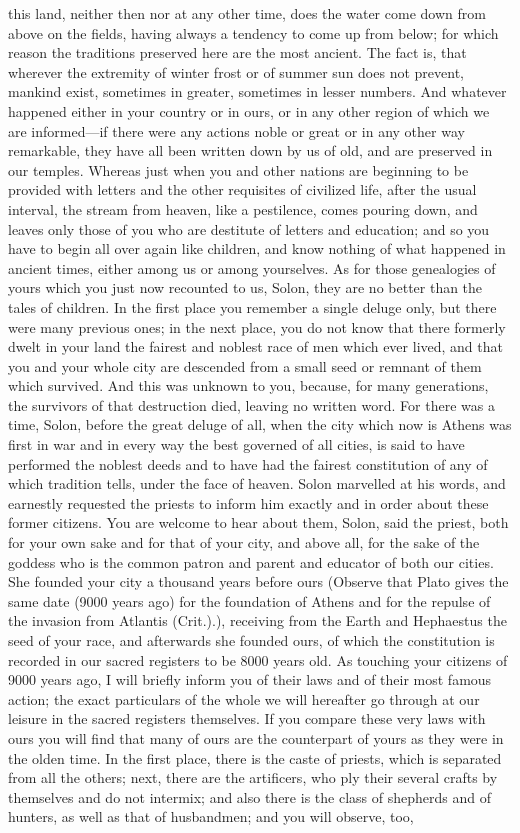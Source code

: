\documentclass[12pt]{article}
\begin{document}
this land, neither then nor at any other time, does the water come down from above on the fields, having always a tendency to come up from below; for which reason the traditions preserved here are the most ancient. The fact is, that wherever the extremity of winter frost or of summer sun does not prevent, mankind exist, sometimes in greater, sometimes in lesser numbers. And whatever happened either in your country or in ours, or in any other region of which we are informed---if there were any actions noble or great or in any other way remarkable, they have all been written down by us of old, and are preserved in our temples. Whereas just when you and other nations are beginning to be provided with letters and the other requisites of civilized life, after the usual interval, the stream from heaven, like a pestilence, comes pouring down, and leaves only those of you who are destitute of letters and education; and so you have to begin all over again like children, and know nothing of what happened in ancient times, either among us or among yourselves. As for those genealogies of yours which you just now recounted to us, Solon, they are no better than the tales of children. In the first place you remember a single deluge only, but there were many previous ones; in the next place, you do not know that there formerly dwelt in your land the fairest and noblest race of men which ever lived, and that you and your whole city are descended from a small seed or remnant of them which survived. And this was unknown to you, because, for many generations, the survivors of that destruction died, leaving no written word. For there was a time, Solon, before the great deluge of all, when the city which now is Athens was first in war and in every way the best governed of all cities, is said to have performed the noblest deeds and to have had the fairest constitution of any of which tradition tells, under the face of heaven. Solon marvelled at his words, and earnestly requested the priests to inform him exactly and in order about these former citizens. You are welcome to hear about them, Solon, said the priest, both for your own sake and for that of your city, and above all, for the sake of the goddess who is the common patron and parent and educator of both our cities. She founded your city a thousand years before ours (Observe that Plato gives the same date (9000 years ago) for the foundation of Athens and for the repulse of the invasion from Atlantis (Crit.).), receiving from the Earth and Hephaestus the seed of your race, and afterwards she founded ours, of which the constitution is recorded in our sacred registers to be 8000 years old. As touching your citizens of 9000 years ago, I will briefly inform you of their laws and of their most famous action; the exact particulars of the whole we will hereafter go through at our leisure in the sacred registers themselves. If you compare these very laws with ours you will find that many of ours are the counterpart of yours as they were in the olden time. In the first place, there is the caste of priests, which is separated from all the others; next, there are the artificers, who ply their several crafts by themselves and do not intermix; and also there is the class of shepherds and of hunters, as well as that of husbandmen; and you will observe, too, 
\end{document}
